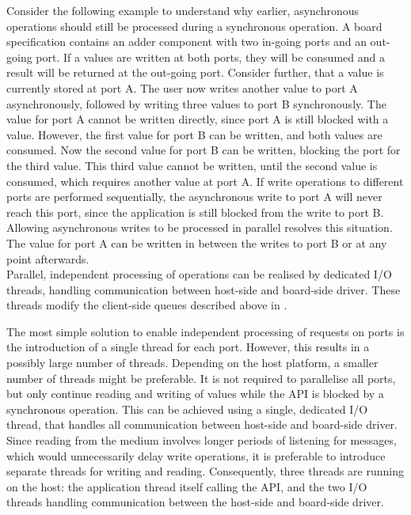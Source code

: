 \documentclass{report}
\begin{document}
Consider the following example to understand why earlier, asynchronous operations should still be processed during a synchronous operation. A board specification contains an adder component with two in-going ports and an out-going port. If a values are written at both ports, they will be consumed and a result will be returned at the out-going port. Consider further, that a value is currently stored at port A. The user now writes another value to port A asynchronously, followed by writing three values to port B synchronously. The value for port A cannot be written directly, since port A is still blocked with a value. However, the first value for port B can be written, and both values are consumed. Now the second value for port B can be written, blocking the port for the third value. This third value cannot be written, until the second value is consumed, which requires another value at port A. If write operations to different ports are performed sequentially, the asynchronous write to port A will never reach this port, since the application is still blocked from the write to port B. Allowing asynchronous writes to be processed in parallel resolves this situation. The value for port A can be written in between the writes to port B or at any point afterwards.\\

Parallel, independent processing of operations can be realised by dedicated I/O threads, handling communication between host-side and board-side driver. These threads modify the client-side queues described above in .

The most simple solution to enable independent processing of requests on ports is the introduction of a single thread for each port. However, this results in a possibly large number of threads. Depending on the host platform, a smaller number of threads might be preferable. It is not required to parallelise all ports, but only continue reading and writing of values while the API is blocked by a synchronous operation. This can be achieved using a single, dedicated I/O thread, that handles all communication between host-side and board-side driver. Since reading from the medium involves longer periods of listening for messages, which would unnecessarily delay write operations, it is preferable to introduce separate threads for writing and reading. Consequently, three threads are running on the host: the application thread itself calling the API, and the two I/O threads handling communication between the host-side and board-side driver.
\end{document}
